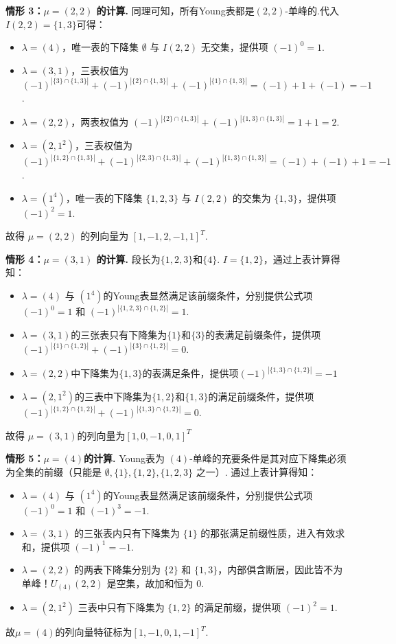 \documentclass{sjtureport}
\begin{document}
\textbf{情形 3：$\mu=(2,2)$ 的计算. }
同理可知，所有Young表都是$(2,2)$-单峰的.代入$I(2,2)=\{1,3\}$可得：
\begin{itemize}
    \item $\lambda=(4)$，唯一表的下降集 $\emptyset$ 与 $I(2,2)$ 无交集，提供项 $(-1)^0=1$. 
    \item $\lambda=(3,1)$，三表权值为 $(-1)^{|\{3\}\cap\{1,3\}|}+(-1)^{|\{2\}\cap\{1,3\}|}+(-1)^{|\{1\}\cap\{1,3\}|} = (-1)+1+(-1) = -1$. 
    \item $\lambda=(2,2)$，两表权值为 $(-1)^{|\{2\}\cap\{1,3\}|} + (-1)^{|\{1,3\}\cap\{1,3\}|} = 1+1 = 2$. 
    \item $\lambda=(2,1^2)$，三表权值为 $(-1)^{|\{1,2\}\cap\{1,3\}|}+(-1)^{|\{2,3\}\cap\{1,3\}|}+(-1)^{|\{1,3\}\cap\{1,3\}|} = (-1)+(-1)+1 = -1$. 
    \item $\lambda=(1^4)$，唯一表的下降集 $\{1,2,3\}$ 与 $I(2,2)$ 的交集为 $\{1,3\}$，提供项 $(-1)^2=1$. 
\end{itemize}
故得 $\mu=(2,2)$ 的列向量为 $[1, -1, 2, -1, 1]^T$. 

\textbf{情形 4：$\mu=(3,1)$ 的计算. }
段长为$\{1,2,3\}$和$\{4\}$. $I=\{1,2\}$，通过上表计算得知：
\begin{itemize}
    \item $\lambda=(4)$ 与 $(1^4)$的Young表显然满足该前缀条件，分别提供公式项 $(-1)^0 = 1$ 和 $(-1)^{|\{1,2,3\}\cap \{1,2\}|} = 1$.
    \item $\lambda=(3,1)$的三张表只有下降集为$\{1\}$和$\{3\}$的表满足前缀条件，提供项 $(-1)^{|\{1\}\cap\{1,2\}|}+(-1)^{|\{3\}\cap\{1,2\}|} = 0$.
    \item $\lambda=(2,2)$中下降集为$\{1,3\}$的表满足条件，提供项$(-1)^{|\{1,3\}\cap\{1,2\}|}=-1$
    \item $\lambda=(2,1^2)$的三表中下降集为$\{1,2\}$和$\{1,3\}$的满足前缀条件，提供项 $(-1)^{|\{1,2\}\cap\{1,2\}|}+(-1)^{|\{1,3\}\cap\{1,2\}|} = 0$.
\end{itemize}
故得 $\mu=(3,1)$的列向量为$[1,0,-1,0,1]^T$

\textbf{情形 5：$\mu=(4)$的计算. } 
Young表为 $(4)$-单峰的充要条件是其对应下降集必须为全集的前缀（只能是 $\emptyset, \{1\}, \{1,2\}, \{1,2,3\}$ 之一）. 通过上表计算得知：
\begin{itemize}
    \item $\lambda=(4)$ 与 $(1^4)$的Young表显然满足该前缀条件，分别提供公式项 $(-1)^0 = 1$ 和 $(-1)^3 = -1$. 
    \item $\lambda=(3,1)$ 的三张表内只有下降集为 $\{1\}$ 的那张满足前缀性质，进入有效求和，提供项 $(-1)^1 = -1$. 
    \item $\lambda=(2,2)$ 的两表下降集分别为 $\{2\}$ 和 $\{1,3\}$，内部俱含断层，因此皆不为单峰！$U_{(4)}(2,2)$ 是空集，故加和恒为 $0$. 
    \item $\lambda=(2,1^2)$ 三表中只有下降集为 $\{1,2\}$ 的满足前缀，提供项 $(-1)^2 = 1$. 
\end{itemize}
故$\mu=(4)$的列向量特征标为$[1, -1, 0, 1, -1]^T$. 
\end{document}
